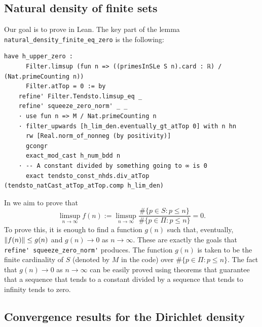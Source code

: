 \documentclass[a4paper,11pt]{article}
\theoremstyle{plain}
\begin{document}
    \subsection{Natural density of finite sets}

    Our goal is to prove  in Lean. The key part of the lemma \lstinline|natural_density_finite_eq_zero| is the following:\\
    \begin{lstlisting}[caption={(Part of the) proof that a finite set has zero natural density.}, label={list:6}]
	  have h_upper_zero :
      Filter.limsup (fun n => ((primesInSLe S n).card : ℝ) / (Nat.primeCounting n))
      Filter.atTop = 0 := by
    refine' Filter.Tendsto.limsup_eq _
    refine' squeeze_zero_norm' _ _
    · use fun n => M / Nat.primeCounting n
    · filter_upwards [h_lim_den.eventually_gt_atTop 0] with n hn
      rw [Real.norm_of_nonneg (by positivity)]
      gcongr
      exact_mod_cast h_num_bdd n
    · -- A constant divided by something going to ∞ is 0
      exact tendsto_const_nhds.div_atTop (tendsto_natCast_atTop_atTop.comp h_lim_den)
	\end{lstlisting}

    In  we aim to prove that
    \begin{equation*}
        \limsup_{n\rightarrow\infty} f(n):=\limsup_{n\rightarrow\infty}\frac{\#\{p\in S: p \leq n\}}{\#\{p\in \Pi: p \leq n\}}=0.
    \end{equation*}
    To prove this, it is enough to find a function $g(n)$ such that, eventually, $\norm{f(n)}\leq g(n)$ and $g(n)\rightarrow 0$ as $n\rightarrow\infty$. These are exactly the goals that \lstinline|refine' squeeze_zero_norm'| produces. The function $g(n)$ is taken to be the finite cardinality of $S$ (denoted by $M$ in the code) over $\#\{p\in \Pi: p \leq n\}$. The fact that $g(n)\rightarrow 0$ as $n\rightarrow\infty$ can be easily proved using theorems that guarantee that a sequence that tends to a constant divided by a sequence that tends to infinity tends to zero. 

    \subsection{Convergence results for the Dirichlet density}
\end{document}
